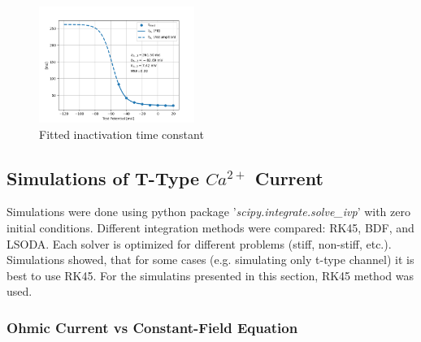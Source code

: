 \documentclass[../../workflow.tex]{subfiles}
\begin{document}
\begin{figure}[H]
    \centering
    \includegraphics[width=0.45\textwidth]{./img/t_type_calcium_channel/inactivation_tau_fit_2.png}
    \caption{Fitted inactivation time constant}
    \label{fig:data_fitted_taus_from_jeong_inactivation}
\end{figure}

\FloatBarrier


\subsection{Simulations of T-Type \texorpdfstring{$Ca^{2+}$}{Ca+2} Current}\label{subsec_r5_simulations_t_type_current}

Simulations were done using python package '\textit{scipy.integrate.solve\_ivp}' with
zero initial conditions. Different integration methods were compared: RK45, BDF, and LSODA.
Each solver is optimized for different problems (stiff, non-stiff, etc.). Simulations
showed, that for some cases (e.g. simulating only t-type channel) it is best to use
RK45. For the simulatins presented in this section, RK45 method was used.

\subsubsection{Ohmic Current vs Constant-Field Equation}

\color{orange}
\end{document}

